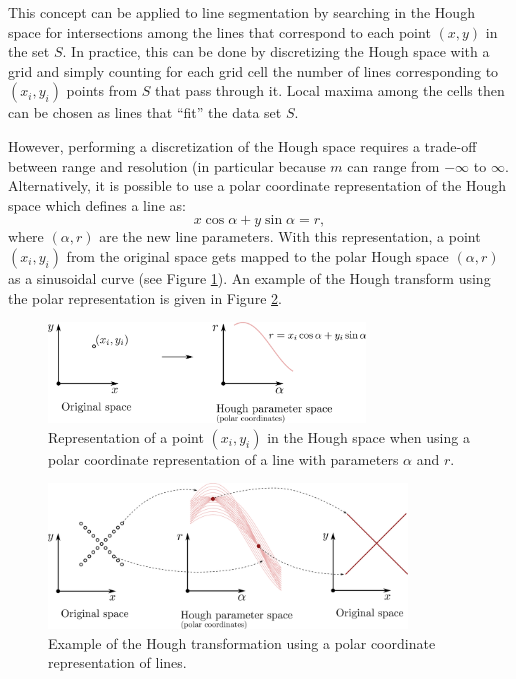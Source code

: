 This concept can be applied to line segmentation by searching in the Hough space for intersections among the lines that correspond to each point $(x,y)$ in the set $S$. In practice, this can be done by discretizing the Hough space with a grid and simply counting for each grid cell the number of lines corresponding to $(x_i,y_i)$ points from $S$ that pass through it. Local maxima among the cells then can be chosen as lines that ``fit'' the data set $S$.

However, performing a discretization of the Hough space requires a trade-off between range and resolution (in particular because $m$ can range from $-\infty$ to $\infty$. Alternatively, it is possible to use a polar coordinate representation of the Hough space which defines a line as:
\begin{equation*}
x \cos \alpha + y \sin \alpha = r,
\end{equation*}
where $(\alpha,r)$ are the new line parameters. With this representation, a point $(x_i,y_i)$ from the original space gets mapped to the polar Hough space $(\alpha,r)$ as a sinusoidal curve (see Figure \ref{fig:hough3}). An example of the Hough transform using the polar representation is given in Figure \ref{fig:hough4}.
\begin{figure}
\centering
	\includegraphics[width=0.75\textwidth]{tex/figs/ch11_figs/hough3.png}
	\caption{Representation of a point $(x_i, y_i)$ in the Hough space when using a polar coordinate representation of a line with parameters $\alpha$ and $r$.}
	\label{fig:hough3}
\end{figure}
\begin{figure}
\centering
	\includegraphics[width=0.85\textwidth]{tex/figs/ch11_figs/hough4.png}
	\caption{Example of the Hough transformation using a polar coordinate representation of lines.}
	\label{fig:hough4}
\end{figure}

